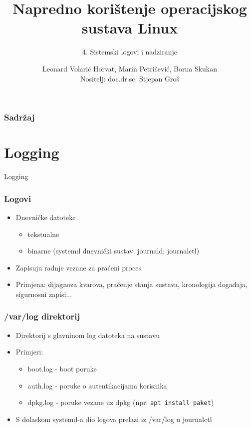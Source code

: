\documentclass[t,table,usenames,dvipsnames]{beamer}
\date{\todayiso}
\title[NKOSL]{Napredno korištenje operacijskog sustava Linux}
\author[Leonard Volarić Horvat, Marin Petričević, Borna Skukan]{Leonard Volarić Horvat, Marin Petričević, Borna Skukan\\{\small Nositelj: doc.dr.sc. Stjepan Groš}}
\subtitle{4. Sistemski logovi i nadziranje}
\institute[FER]{Sveučilište u Zagrebu\\Fakultet elektrotehnike i računarstva}
\newcommand{\shell}[1]{\texttt{#1}}
\begin{document}
{
	\begin{frame}
		\maketitle
	\end{frame}
}

\begin{frame}
    \frametitle{Sadržaj}
    \tableofcontents
\end{frame}

\section{Logging}

\begin{frame}
    \vspace*{\fill}
        \begin{center}
            \Huge{Logging}
        \end{center}
    \vspace*{\fill}
\end{frame}


\begin{frame}
    \frametitle{Logovi}
    \begin{itemize}
        \item Dnevničke datoteke 
        \begin{itemize}
            \item tekstualne
            \item binarne (systemd dnevnički sustav: journald; journalctl)
        \end{itemize}
        \item Zapisuju radnje vezane za praćeni proces
        \item Primjena: dijagnoza kvarova, praćenje stanja sustava, kronologija događaja, sigurnosni zapisi...
    \end{itemize}
\end{frame}



\begin{frame}
    \frametitle{/var/log direktorij}
    \begin{itemize}
        \item Direktorij s glavninom log datoteka na sustavu
        \item Primjeri:
        \begin{itemize}
            \item boot.log - boot poruke
            \item auth.log - poruke o autentikacijama korisnika
            \item dpkg.log - poruke vezane uz dpkg (npr. \shell{apt install paket})
        \end{itemize}
        \item S dolaskom systemd-a dio logova prelazi iz /var/log u journalctl
    \end{itemize}
\end{frame}
\end{document}
